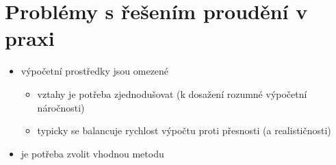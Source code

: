 \documentclass[letterpaper,10pt,czech]{sphinxmanual}
\begin{document}
\section{Problémy s řešením proudění v praxi}
\label{\detokenize{prednaska_19092022:problemy-s-resenim-proudeni-v-praxi}}\begin{itemize}
\item {} 
\sphinxAtStartPar
výpočetní prostředky jsou omezené
\begin{itemize}
\item {} 
\sphinxAtStartPar
vztahy je potřeba zjednodušovat (k dosažení rozumné výpočetní náročnosti)

\item {} 
\sphinxAtStartPar
typicky se balancuje rychlost výpočtu proti přesnosti (a realističnosti)

\end{itemize}

\item {} 
\sphinxAtStartPar
je potřeba zvolit vhodnou metodu

\end{itemize}
\end{document}
